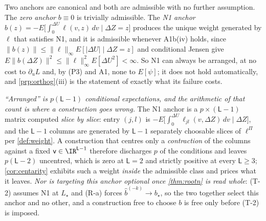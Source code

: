 
\begin{remark}\label{rem:anchor}
Two anchors are canonical and both are admissible with no further assumption. The \emph{zero anchor}
$b\equiv0$ is trivially admissible. The \emph{N1 anchor}
$b(z)=-E\big[\int_0^{\Delta U}\ell(v,z)\,dv\;\big|\;\Delta Z=z\big]$ produces the unique weight generated
by $\ell$ that satisfies N1, and it is admissible whenever A1b(iv) holds, since
$\|b(z)\|\le\|\ell\|_\infty E[|\Delta U|\mid\Delta Z=z]$ and conditional Jensen give
$E\|b(\Delta Z)\|^{2}\le\|\ell\|_\infty^{2}E[\Delta U^{2}]<\infty$. So N1 can always be arranged,
at no cost to $\partial_uL$ and, by \textup{(P3)} and A1, none to $E[\psi]$; it does not hold
automatically, and \cref{prp:orthog}(iii) is the statement of exactly what its failure costs.

\emph{``Arranged'' is $p(\mathsf L-1)$ conditional expectations, and the arithmetic of that count is
where a construction goes wrong.} The N1 anchor is a $p\times(\mathsf L-1)$ matrix computed
\emph{slice by slice}: entry $(j,l)$ is
$-E\big[\int_0^{\Delta U}\ell_{jl}(v,\Delta Z)\,dv\mid\Delta Z\big]$, and the $\mathsf L-1$ columns are
generated by $\mathsf L-1$ separately choosable slices of $\ell^\Pi$ per
\cref{def:weight}. A construction that centres only a \emph{contraction} of the columns against a fixed
$\mathsf v\in\IR^{\mathsf L-1}$ therefore discharges $p$ of the conditions and leaves $p(\mathsf L-2)$
uncentred, which is zero at $\mathsf L=2$ and strictly positive at every $\mathsf L\ge3$;
\cref{cor:centarity} exhibits such a weight \emph{inside} the admissible class and prices what it leaves.
\emph{Nor is targeting this anchor optional once \cref{thm:rootn} is read whole}: \textup{(T-2)} assumes
N1 at $L_\star$ and \textup{(R-a)} forces $\hat b^{(-k)}\to b_\star$, so the two together select this
anchor and no other, and a construction free to choose $b$ is free only before \textup{(T-2)} is
imposed.


\end{remark}
